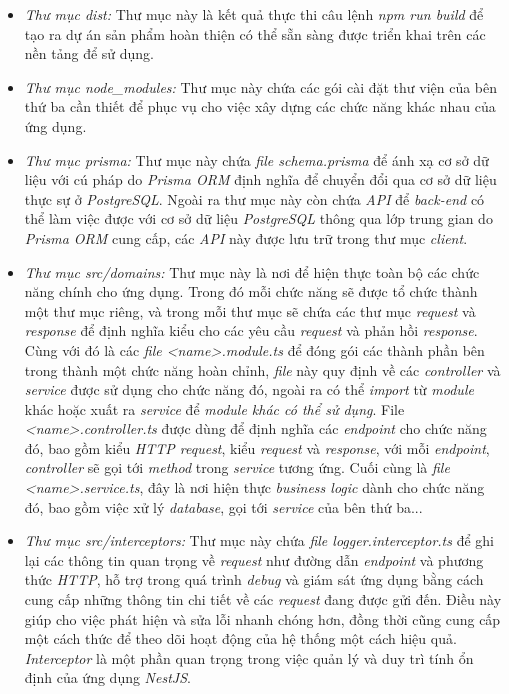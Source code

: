 \begin{itemize}
    \item \textit{Thư mục dist:} Thư mục này là kết quả thực thi câu lệnh \textit{npm run build} để tạo ra dự án sản phẩm hoàn thiện có thể sẵn sàng được triển khai trên các nền tảng để sử dụng.
    \item \textit{Thư mục node\_modules:} Thư mục này chứa các gói cài đặt thư viện của bên thứ ba cần thiết để phục vụ cho việc xây dựng các chức năng khác nhau của ứng dụng.
    \item \textit{Thư mục prisma:} Thư mục này chứa \textit{file schema.prisma} để ánh xạ cơ sở dữ liệu với cú pháp do \textit{Prisma ORM} định nghĩa để chuyển đổi qua cơ sở dữ liệu thực sự ở \textit{PostgreSQL}. Ngoài ra thư mục này còn chứa \textit{API} để \textit{back-end} có thể làm việc được với cơ sở dữ liệu \textit{PostgreSQL} thông qua lớp trung gian do \textit{Prisma ORM} cung cấp, các \textit{API} này được lưu trữ trong thư mục \textit{client}.
    \item \textit{Thư mục src/domains:} Thư mục này là nơi để hiện thực toàn bộ các chức năng chính cho ứng dụng. Trong đó mỗi chức năng sẽ được tổ chức thành một thư mục riêng, và trong mỗi thư mục sẽ chứa các thư mục \textit{request} và \textit{response} để định nghĩa kiểu cho các yêu cầu \textit{request} và phản hồi \textit{response}. Cùng với đó là các \textit{file <name>.module.ts} để đóng gói các thành phần bên trong thành một chức năng hoàn chỉnh, \textit{file} này quy định về các \textit{controller} và \textit{service} được sử dụng cho chức năng đó, ngoài ra có thể \textit{import} từ \textit{module} khác hoặc xuất ra \textit{service} để \textit{module khác có thể sử dụng}. File \textit{<name>.controller.ts} được dùng để định nghĩa các \textit{endpoint} cho chức năng đó, bao gồm kiểu \textit{HTTP request}, kiểu \textit{request} và \textit{response}, với mỗi \textit{endpoint}, \textit{controller} sẽ gọi tới \textit{method} trong \textit{service} tương ứng. Cuối cùng là \textit{file} \textit{<name>.service.ts}, đây là nơi hiện thực \textit{business logic} dành cho chức năng đó, bao gồm việc xử lý \textit{database}, gọi tới \textit{service} của bên thứ ba...
    \item \textit{Thư mục src/interceptors:} Thư mục này chứa \textit{file logger.interceptor.ts} để ghi lại các thông tin quan trọng về \textit{request} như đường dẫn \textit{endpoint} và phương thức \textit{HTTP}, hỗ trợ trong quá trình \textit{debug} và giám sát ứng dụng bằng cách cung cấp những thông tin chi tiết về các \textit{request} đang được gửi đến. Điều này giúp cho việc phát hiện và sửa lỗi nhanh chóng hơn, đồng thời cũng cung cấp một cách thức để theo dõi hoạt động của hệ thống một cách hiệu quả. \textit{Interceptor} là một phần quan trọng trong việc quản lý và duy trì tính ổn định của ứng dụng \textit{NestJS}.

\end{itemize}
